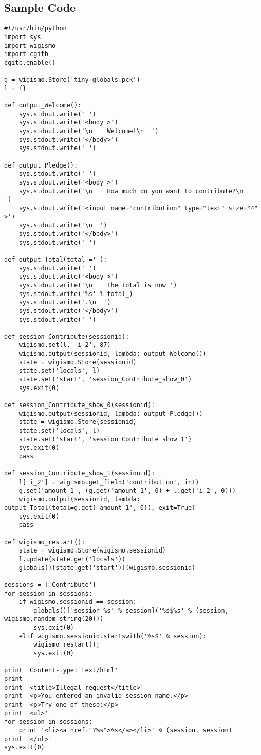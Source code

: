 \documentclass{WigReport}
\begin{document}
\subsection{Sample Code}
\begin{verbatim}
#!/usr/bin/python
import sys
import wigismo
import cgitb
cgitb.enable()

g = wigismo.Store('tiny_globals.pck')
l = {}

def output_Welcome():
    sys.stdout.write(' ')
    sys.stdout.write('<body >')
    sys.stdout.write('\n    Welcome!\n  ')
    sys.stdout.write('</body>')
    sys.stdout.write(' ')

def output_Pledge():
    sys.stdout.write(' ')
    sys.stdout.write('<body >')
    sys.stdout.write('\n    How much do you want to contribute?\n    ')
    sys.stdout.write('<input name="contribution" type="text" size="4" >')
    sys.stdout.write('\n  ')
    sys.stdout.write('</body>')
    sys.stdout.write(' ')

def output_Total(total_=''):
    sys.stdout.write(' ')
    sys.stdout.write('<body >')
    sys.stdout.write('\n    The total is now ')
    sys.stdout.write('%s' % total_)
    sys.stdout.write('.\n  ')
    sys.stdout.write('</body>')
    sys.stdout.write(' ')

def session_Contribute(sessionid):
    wigismo.set(l, 'i_2', 87)
    wigismo.output(sessionid, lambda: output_Welcome())
    state = wigismo.Store(sessionid)
    state.set('locals', l)
    state.set('start', 'session_Contribute_show_0')
    sys.exit(0)

def session_Contribute_show_0(sessionid):
    wigismo.output(sessionid, lambda: output_Pledge())
    state = wigismo.Store(sessionid)
    state.set('locals', l)
    state.set('start', 'session_Contribute_show_1')
    sys.exit(0)
    pass

def session_Contribute_show_1(sessionid):
    l['i_2'] = wigismo.get_field('contribution', int)
    g.set('amount_1', (g.get('amount_1', 0) + l.get('i_2', 0)))
    wigismo.output(sessionid, lambda: output_Total(total=g.get('amount_1', 0)), exit=True)
    sys.exit(0)
    pass

def wigismo_restart():
    state = wigismo.Store(wigismo.sessionid)
    l.update(state.get('locals'))
    globals()[state.get('start')](wigismo.sessionid)

sessions = ['Contribute']
for session in sessions:
    if wigismo.sessionid == session:
        globals()['session_%s' % session]('%s$%s' % (session, wigismo.random_string(20)))
        sys.exit(0)
    elif wigismo.sessionid.startswith('%s$' % session):
        wigismo_restart();
        sys.exit(0)

print 'Content-type: text/html'
print
print '<title>Illegal request</title>'
print '<p>You entered an invalid session name.</p>'
print '<p>Try one of these:</p>'
print '<ul>'
for session in sessions:
    print '<li><a href="?%s">%s</a></li>' % (session, session)
print '</ul>'
sys.exit(0)
\end{verbatim}
\end{document}
